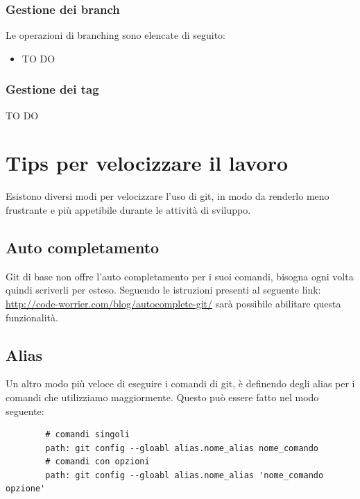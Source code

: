 		\subsubsection{Gestione dei branch} %
		\label{ssub:gestione_dei_branch_remoto}
		Le operazioni di branching sono elencate di seguito:
			\begin{itemize}
				\item TO DO
			\end{itemize}

		\subsubsection{Gestione dei tag} %
		\label{ssub:gestione_dei_tag_remoto}
		TO DO



\newpage \clearpage
\section{Tips per velocizzare il lavoro} %
\label{sec:tips_per_velocizzare_il_lavoro}
Esistono diversi modi per velocizzare l'uso di git, in modo da renderlo meno frustrante e più appetibile durante le attività di sviluppo.
	\subsection{Auto completamento} %
	\label{sub:auto_completamento}
	Git di base non offre l'auto completamento per i suoi comandi, bisogna ogni volta quindi scriverli per esteso. Seguendo le istruzioni presenti al seguente link: \url{http://code-worrier.com/blog/autocomplete-git/} sarà possibile abilitare questa funzionalità.

	\subsection{Alias} %
	\label{sub:alias}
	Un altro modo più veloce di eseguire i comandi di git, è definendo degli alias per i comandi che utilizziamo maggiormente. Questo può essere fatto nel modo seguente:
	\begin{verbatim}
		# comandi singoli
		path: git config --gloabl alias.nome_alias nome_comando
		# comandi con opzioni
		path: git config --gloabl alias.nome_alias 'nome_comando opzione'
	\end{verbatim}

